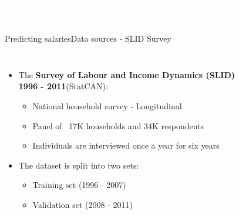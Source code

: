 \documentclass[aspectratio=169, xcolor=dvipsnames]{beamer}
\begin{document}
{
\begin{frame}
    \begin{center}
        \textcolor{white}{{\fontsize{22pt}{14pt}\selectfont \textbf{Predicting salaries}}}\\
        \vspace{20pt}
        \textcolor{white}{{\fontsize{14pt}{10pt}\selectfont \textsl{From point estimates to probability distributions}}}
    \end{center}
\end{frame}
}

\begin{frame}{Predicting salaries}{Data sources - SLID Survey}
    \vspace*{-40pt}
    \begin{columns}
            \begin{itemize}
                \setlength{\itemsep}{10pt} %
                \item \fontsize{10pt}{12pt}\selectfont The \textbf{Survey of Labour and Income Dynamics (SLID) 1996 - 2011}(StatCAN):
                \begin{itemize}
                    \item \fontsize{10pt}{12pt}\selectfont National household survey - Longitudinal 
                    \item \fontsize{10pt}{12pt}\selectfont Panel of ~17K households and 34K respondents
                    \item \fontsize{10pt}{12pt}\selectfont Individuals are interviewed once a year for six years
                \end{itemize}
                \item \fontsize{10pt}{12pt}\selectfont The dataset is split into two sets:
                \begin{itemize}
                    \item \fontsize{10pt}{12pt}\selectfont Training set (1996 - 2007)
                    \item \fontsize{10pt}{12pt}\selectfont Validation set (2008 - 2011)
                \end{itemize}
            \end{itemize}
            \begin{figure}
                \centering

\end{figure}
\end{columns}
\end{frame}
\end{document}
